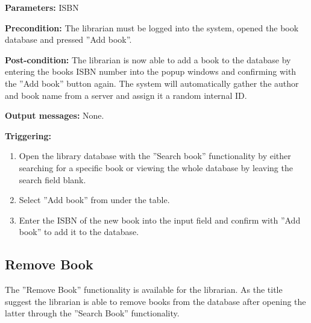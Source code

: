 \begin{description}

\item \textbf{Parameters:} ISBN

\item \textbf{Precondition:} The librarian must be logged into the system,
opened the book database and pressed ''Add book''.

\item \textbf{Post-condition:} The librarian is now able to add a book to the
database by entering the books ISBN number into the popup windows and
confirming with the ''Add book'' button again. The system will automatically
gather the author and book name from a server and assign it a random internal
ID.

\item \textbf{Output messages:} None.

\item \textbf{Triggering:}
\begin{enumerate}
\item Open the library database with the ''Search book'' functionality by
either searching for a specific book or viewing the whole database by leaving
the search field blank.
\item Select ''Add book'' from under the table.
\item Enter the ISBN of the new book into the input field and confirm with ''Add
book'' to add it to the database.
\end{enumerate}

\end{description}

\subsection{Remove Book}

The ''Remove Book'' functionality is available for the librarian. As the title
suggest the librarian is able to remove books from the database after opening
the latter through the ''Search Book'' functionality.

